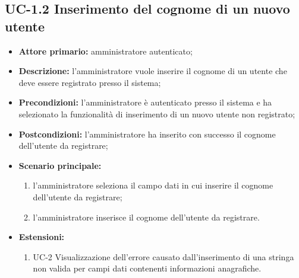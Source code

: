 \subsection{UC-1.2 Inserimento del cognome di un nuovo utente}
\begin{itemize}
	\item \textbf{Attore primario:} amministratore autenticato;

	\item \textbf{Descrizione:} l'amministratore vuole inserire il cognome di un utente che deve essere registrato presso il sistema;

	\item \textbf{Precondizioni:} l'amministratore è autenticato presso il sistema e ha selezionato la funzionalità di inserimento di un nuovo utente non registrato;

	\item \textbf{Postcondizioni:} l'amministratore ha inserito con successo il cognome dell'utente da registrare;

	\item \textbf{Scenario principale:}
		\begin{enumerate}
    		\item l'amministratore seleziona il campo dati in cui inserire il cognome dell'utente da registrare;
    			\item l'amministratore inserisce il cognome dell'utente da registrare.
		\end{enumerate}
	\item \textbf{Estensioni:}
		\begin{enumerate}
    		\item UC-2 Visualizzazione dell'errore causato dall'inserimento di una stringa non valida per campi dati contenenti informazioni anagrafiche.
		\end{enumerate}
\end{itemize}
